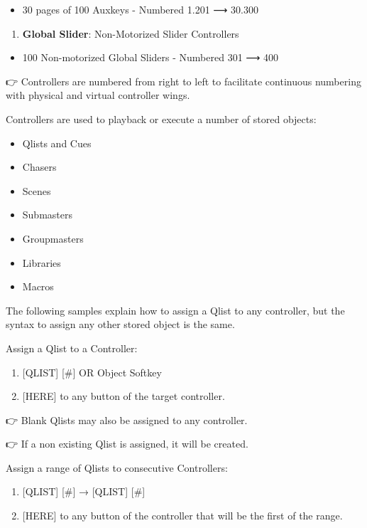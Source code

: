 \documentclass[
]{article}
\providecommand{\tightlist}{%
  \setlength{\itemsep}{0pt}\setlength{\parskip}{0pt}}
\begin{document}
\begin{itemize}
\tightlist
\item
  30 pages of 100 Auxkeys - Numbered 1.201 ⟶ 30.300
\end{itemize}

\begin{enumerate}
\def\labelenumi{\arabic{enumi}.}
\setcounter{enumi}{4}
\tightlist
\item
  \textbf{Global Slider}: Non-Motorized Slider Controllers
\end{enumerate}

\begin{itemize}
\tightlist
\item
  100 Non-motorized Global Sliders - Numbered 301 ⟶ 400
\end{itemize}

👉 Controllers are numbered from right to left to facilitate continuous numbering with physical and virtual controller wings.

Controllers are used to playback or execute a number of stored objects:

\begin{itemize}
\item
  Qlists and Cues
\item
  Chasers
\item
  Scenes
\item
  Submasters
\item
  Groupmasters
\item
  Libraries
\item
  Macros
\end{itemize}

The following samples explain how to assign a Qlist to any controller, but the syntax to assign any other stored object is the same.

Assign a Qlist to a Controller:

\begin{enumerate}
\def\labelenumi{\arabic{enumi}.}
\item
  {[}QLIST{]} {[}\#{]} OR Object Softkey
\item
  {[}HERE{]} to any button of the target controller.
\end{enumerate}

👉 Blank Qlists may also be assigned to any controller.

👉 If a non existing Qlist is assigned, it will be created.

Assign a range of Qlists to consecutive Controllers:

\begin{enumerate}
\def\labelenumi{\arabic{enumi}.}
\item
  {[}QLIST{]} {[}\#{]} → {[}QLIST{]} {[}\#{]}
\item
  {[}HERE{]} to any button of the controller that will be the first of the range.
\end{enumerate}
\end{document}
